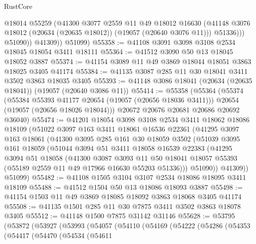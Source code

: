 \begin{lexlean}{RustCore}
\begin{coremodule}
                  @18014
                  @55259
                  (@41300
                    @3077
                    @2559
                    @11
                    @49
                    @18012
                    @16630
                    (@41148 @3076 @18012 (@20634 (@20635 @18012)) (@19057 (@20640 @3076 @11)))
                    @51336)))
              @51090))
          @41309))
      @51099)
@55358 := @41108 @3091 @3098 @3108 @2534 @18045 @18054 @3411 @18111
@55364 := @41512 @3090 @50 @13 @18045 @18052 @3887
@55374 := @41154 @3089 @11 @49 @3869 @18044 @18051 @3863 @18025 @3405 @41174
@55384 := @41135 @3087 @285 @11 @30 @18041 @3411 @3502 @3863 @18035 @3405
@55393 := @41148 @3086 @18041 (@20634 (@20635 @18041)) (@19057 (@20640 @3086 @11))
@55414 := @55358
    (@55364
      (@55374
        (@55384 @55393 @41177 @20654 (@19057 (@20656 @18036 @3411)))
        @20654
        (@19057 (@20656 @18026 @18044)))
      @20672
      @20676
      @20681
      @20686
      @20692
      @36040)
@55474 := @41201
    @18054
    @3098
    @3108
    @2534
    @3411
    @18062
    @18086
    @18109
    (@51022
      @3097
      @163
      @3411
      @18061
      @16536
      @22361
      (@41295
        @3097
        @163
        @18061
        (@41300
          @3095
          @285
          @161
          @30
          @18059
          @3502
          (@51039
            @3095
            @161
            @18059
            (@51044
              @3094
              @51
              @3411
              @18058
              @16539
              @22383
              (@41295
                @3094
                @51
                @18058
                (@41300
                  @3087
                  @3093
                  @11
                  @50
                  @18041
                  @18057
                  @55393
                  (@55189 @2559 @11 @49 @17966 @16630 @55203 @51336)))
              @51090))
          @41309))
      @51099)
@55482 := @41108 @1505 @3104 @3107 @2534 @18086 @18095 @3411 @18109
@55488 := @41512 @1504 @50 @13 @18086 @18093 @3887
@55498 := @41154 @1503 @11 @49 @3869 @18085 @18092 @3863 @18068 @3405 @41174
@55508 := @41135 @1501 @285 @11 @30 @7875 @3411 @3502 @3863 @18078 @3405
@55512 := @41148 @1500 @7875 @31142 @31146
@55628 := @53795
    (@53872
      (@53927
        (@53993
          (@54057
            (@54110
              (@54169
                (@54222
                  (@54286
                    (@54353
                      (@54417
                        (@54470
                          (@54534
                            (@54611

\end{coremodule}
\end{lexlean}
